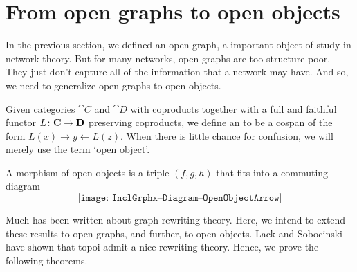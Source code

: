 %
%

	

\section{From open graphs to open objects} %

In the previous section,
we defined an open graph,
a important object of study
in network theory.
But for many networks,
open graphs are too structure poor.
They just don't capture all of
the information that a network may have.
And so, we need to generalize open graphs
to open objects.

Given categories $\cat{C}$ and $\cat{D}$
with coproducts together with a full and faithful
functor $L \colon \mathbf{C} \to \mathbf{D}$
preserving coproducts, we define an
 to be a cospan
of the form $ L ( x ) \to y \gets L ( z ) $.
When there is little chance for confusion,
we will merely use the term `open object'.

A morphism of open objects is a triple
$ (f,g,h) $ that fits into a commuting diagram
\[
	\texttt{[image: InclGrphx--Diagram--OpenObjectArrow]}
\]

Much has been written about
graph rewriting theory. 
Here, we intend to extend
these results to open graphs,
and further, to open objects.
Lack and Sobocinski 
have shown that topoi
admit a nice rewriting theory.
Hence, we prove the following
theorems. 
  












